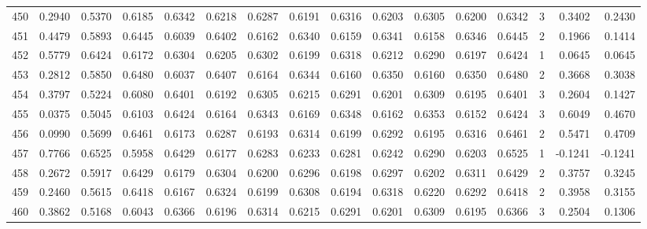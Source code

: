 \begin{tabular}{lrrrrrrrrrrrrrrr}
450 &      0.2940 &  0.5370 &  0.6185 &  0.6342 &  0.6218 &  0.6287 &  0.6191 &  0.6316 &  0.6203 &  0.6305 &   0.6200 &     0.6342 &      3 &                    0.3402 &                     0.2430 \\
451 &      0.4479 &  0.5893 &  0.6445 &  0.6039 &  0.6402 &  0.6162 &  0.6340 &  0.6159 &  0.6341 &  0.6158 &   0.6346 &     0.6445 &      2 &                    0.1966 &                     0.1414 \\
452 &      0.5779 &  0.6424 &  0.6172 &  0.6304 &  0.6205 &  0.6302 &  0.6199 &  0.6318 &  0.6212 &  0.6290 &   0.6197 &     0.6424 &      1 &                    0.0645 &                     0.0645 \\
453 &      0.2812 &  0.5850 &  0.6480 &  0.6037 &  0.6407 &  0.6164 &  0.6344 &  0.6160 &  0.6350 &  0.6160 &   0.6350 &     0.6480 &      2 &                    0.3668 &                     0.3038 \\
454 &      0.3797 &  0.5224 &  0.6080 &  0.6401 &  0.6192 &  0.6305 &  0.6215 &  0.6291 &  0.6201 &  0.6309 &   0.6195 &     0.6401 &      3 &                    0.2604 &                     0.1427 \\
455 &      0.0375 &  0.5045 &  0.6103 &  0.6424 &  0.6164 &  0.6343 &  0.6169 &  0.6348 &  0.6162 &  0.6353 &   0.6152 &     0.6424 &      3 &                    0.6049 &                     0.4670 \\
456 &      0.0990 &  0.5699 &  0.6461 &  0.6173 &  0.6287 &  0.6193 &  0.6314 &  0.6199 &  0.6292 &  0.6195 &   0.6316 &     0.6461 &      2 &                    0.5471 &                     0.4709 \\
457 &      0.7766 &  0.6525 &  0.5958 &  0.6429 &  0.6177 &  0.6283 &  0.6233 &  0.6281 &  0.6242 &  0.6290 &   0.6203 &     0.6525 &      1 &                   -0.1241 &                    -0.1241 \\
458 &      0.2672 &  0.5917 &  0.6429 &  0.6179 &  0.6304 &  0.6200 &  0.6296 &  0.6198 &  0.6297 &  0.6202 &   0.6311 &     0.6429 &      2 &                    0.3757 &                     0.3245 \\
459 &      0.2460 &  0.5615 &  0.6418 &  0.6167 &  0.6324 &  0.6199 &  0.6308 &  0.6194 &  0.6318 &  0.6220 &   0.6292 &     0.6418 &      2 &                    0.3958 &                     0.3155 \\
460 &      0.3862 &  0.5168 &  0.6043 &  0.6366 &  0.6196 &  0.6314 &  0.6215 &  0.6291 &  0.6201 &  0.6309 &   0.6195 &     0.6366 &      3 &                    0.2504 &                     0.1306 \\

\end{tabular}
